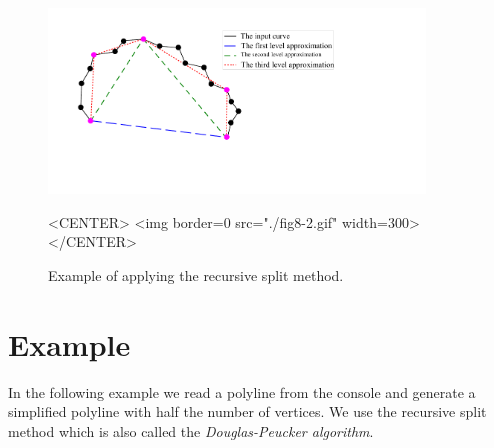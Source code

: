 \begin{figure}[h]
\begin{ccTexOnly}
\begin{center}
\includegraphics[width=10cm]{Polygonal_approximation_d/fig8-2} 
\end{center}
\end{ccTexOnly}
\caption{Example of  applying the recursive split method.
\label{Simplification_Fig_RecursiveSplit}}
\begin{ccHtmlOnly}
<CENTER>
<img border=0 src="./fig8-2.gif" width=300>
</CENTER>
\end{ccHtmlOnly}
\end{figure}




\section{Example}

In the following example we read a polyline from the console and generate
a simplified polyline with half the number of vertices. We use the recursive
split method which is also called the {\em Douglas-Peucker algorithm}.





